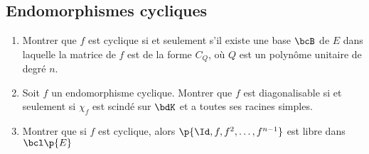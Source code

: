 \documentclass[a4paper,french,bookmarks]{article}
\begin{document}
    \subsection{Endomorphismes cycliques}
    
    \begin{enumerate}[resume]
        \item Montrer que $f$ est cyclique si et seulement s'il existe une base $\bcB$ de $E$ dans laquelle la matrice de $f$ est de la forme $C_Q$, où $Q$ est un polynôme unitaire de degré $n$.
        
        \item Soit $f$ un endomorphisme cyclique. Montrer que $f$ est diagonalisable si et seulement si $\chi_f$ est scindé sur $\bdK$ et a toutes ses racines simples.
        
        \item Montrer que si $f$ est cyclique, alors $\p{\Id, f, f^2, \dots, f^{n-1}}$ est libre dans $\bcl\p{E}$
    \end{enumerate}
    
    
\end{document}
